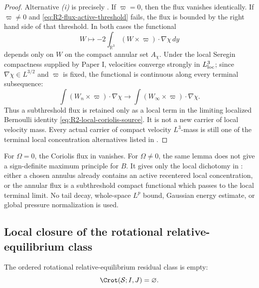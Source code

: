 \begin{proof}
Alternative \emph{(i)} is precisely
.  If \(\varpi=0\), then the flux
vanishes identically.  If \(\varpi\ne0\) and
\eqref{eq:R2-flux-active-threshold} fails, the flux is bounded by the right hand
side of that threshold.  In both cases the functional
\[
   W\longmapsto -2\int_{\mathbb R^3}(W\times\varpi)\cdot\nabla\chi\,dy
\]
depends only on \(W\) on the compact annular set \(A_\chi\).  Under the local
Seregin compactness supplied by Paper I, velocities converge strongly in
\(L^3_{\rm loc}\); since \(\nabla\chi\in L^{3/2}\) and \(\varpi\) is fixed, the
functional is continuous along every terminal subsequence:
\[
   \int (W_n\times\varpi)\cdot\nabla\chi
   \longrightarrow
   \int (W_\infty\times\varpi)\cdot\nabla\chi .
\]
Thus a subthreshold flux is retained only as a local term in the limiting
localized Bernoulli identity \eqref{eq:R2-local-coriolis-source}.  It is not a
new carrier of local velocity mass.  Every actual carrier of compact velocity
\(L^3\)-mass is still one of the terminal local concentration alternatives listed in
.
\end{proof}

\begin{remark}
\label{rem:R2-no-global-liouville}
For \(\Omega=0\), the Coriolis flux in
 vanishes.  For \(\Omega\ne0\), the
same lemma does not give a sign-definite maximum principle for \(B\).  It gives
only the local dichotomy in : either a
chosen annulus already contains an active recentered local concentration, or the
annular flux is a subthreshold compact functional which passes to the local
terminal limit.  No tail decay, whole-space \(L^p\) bound, Gaussian energy
estimate, or global pressure normalization is used.
\end{remark}

\subsection{Local closure of the rotational relative-equilibrium class}

\begin{theorem}
\label{thm:R2-exclusion-safe}
The ordered rotational relative-equilibrium residual class is empty:
\begin{equation}\label{eq:R2-empty-safe}
   \Crot(\mathcal S;I,J)=\varnothing .
\end{equation}
\end{theorem}

